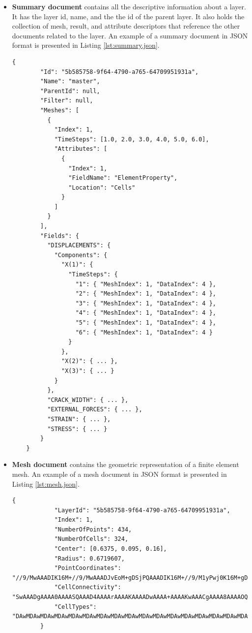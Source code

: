 \begin{itemize}

    \item \textbf{Summary document} contains all the descriptive information about a layer. It has the layer id, name, and the the id of the parent layer. It also holds the collection of mesh, result, and attribute descriptors that reference the other documents related to the layer. An example of a summary document in JSON format is presented in Listing \ref{lst:summary.json}.

    \pagebreak

    \begin{lstlisting}[style=json,caption=Example of summary.json document.,label=lst:summary.json]
    {
        "Id": "5b585758-9f64-4790-a765-64709951931a",
        "Name": "master",
        "ParentId": null,
        "Filter": null,
        "Meshes": [
          {
            "Index": 1,
            "TimeSteps": [1.0, 2.0, 3.0, 4.0, 5.0, 6.0],
            "Attributes": [
              {
                "Index": 1,
                "FieldName": "ElementProperty",
                "Location": "Cells"
              }
            ]
          }
        ],
        "Fields": {
          "DISPLACEMENTS": {
            "Components": {
              "X(1)": {
                "TimeSteps": {
                  "1": { "MeshIndex": 1, "DataIndex": 4 },
                  "2": { "MeshIndex": 1, "DataIndex": 4 },
                  "3": { "MeshIndex": 1, "DataIndex": 4 },
                  "4": { "MeshIndex": 1, "DataIndex": 4 },
                  "5": { "MeshIndex": 1, "DataIndex": 4 },
                  "6": { "MeshIndex": 1, "DataIndex": 4 }
                }
              },
              "X(2)": { ... },
              "X(3)": { ... }
            }
          },
          "CRACK_WIDTH": { ... },
          "EXTERNAL_FORCES": { ... },
          "STRAIN": { ... },
          "STRESS": { ... }
        }
    }
    \end{lstlisting}
    
    \item \textbf{Mesh document} contains the geometric representation of a finite element mesh. An example of a mesh document in JSON format is presented in Listing \ref{lst:mesh.json}.
    
    \begin{lstlisting}[style=json,caption=Example of mesh.json document.,label=lst:mesh.json]
        {
            "LayerId": "5b585758-9f64-4790-a765-64709951931a",
            "Index": 1,
            "NumberOfPoints": 434,
            "NumberOfCells": 324,
            "Center": [0.6375, 0.095, 0.16],
            "Radius": 0.6719607,
            "PointCoordinates": "//9/MwAAADIK16M+//9/MwAAADJvEoM+gDSjPQAAADIK16M+//9/M1yPwj0K16M+gDSjPQAAAD...",
            "CellConnectivity": "SwAAADgAAAA0AAAASQAAAD4AAAArAAAAKAAAADwAAAA+AAAAKwAAACgAAAA8AAAAOQAAACUAAA...",
            "CellTypes": "DAwMDAwMDAwMDAwMDAwMDAwMDAwMDAwMDAwMDAwMDAwMDAwMDAwMDAwMDAwMDAwMDAwMDAwMDAwMDAwMD..."
        }
    \end{lstlisting}


\end{itemize}

